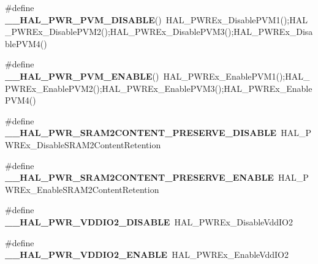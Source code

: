 \begin{DoxyCompactItemize}
\item 
\#define {\bfseries \+\_\+\+\_\+\+H\+A\+L\+\_\+\+P\+W\+R\+\_\+\+P\+V\+M\+\_\+\+D\+I\+S\+A\+B\+LE}()~H\+A\+L\+\_\+\+P\+W\+R\+Ex\+\_\+\+Disable\+P\+V\+M1();H\+A\+L\+\_\+\+P\+W\+R\+Ex\+\_\+\+Disable\+P\+V\+M2();H\+A\+L\+\_\+\+P\+W\+R\+Ex\+\_\+\+Disable\+P\+V\+M3();H\+A\+L\+\_\+\+P\+W\+R\+Ex\+\_\+\+Disable\+P\+V\+M4()\hypertarget{group___h_a_l___p_w_r___aliased___macros_gaec66f2306538bb9002387ceafeb38462}{}\label{group___h_a_l___p_w_r___aliased___macros_gaec66f2306538bb9002387ceafeb38462}

\item 
\#define {\bfseries \+\_\+\+\_\+\+H\+A\+L\+\_\+\+P\+W\+R\+\_\+\+P\+V\+M\+\_\+\+E\+N\+A\+B\+LE}()~H\+A\+L\+\_\+\+P\+W\+R\+Ex\+\_\+\+Enable\+P\+V\+M1();H\+A\+L\+\_\+\+P\+W\+R\+Ex\+\_\+\+Enable\+P\+V\+M2();H\+A\+L\+\_\+\+P\+W\+R\+Ex\+\_\+\+Enable\+P\+V\+M3();H\+A\+L\+\_\+\+P\+W\+R\+Ex\+\_\+\+Enable\+P\+V\+M4()\hypertarget{group___h_a_l___p_w_r___aliased___macros_ga48b28ca62d86e12f33848cbb20ea16dc}{}\label{group___h_a_l___p_w_r___aliased___macros_ga48b28ca62d86e12f33848cbb20ea16dc}

\item 
\#define {\bfseries \+\_\+\+\_\+\+H\+A\+L\+\_\+\+P\+W\+R\+\_\+\+S\+R\+A\+M2\+C\+O\+N\+T\+E\+N\+T\+\_\+\+P\+R\+E\+S\+E\+R\+V\+E\+\_\+\+D\+I\+S\+A\+B\+LE}~H\+A\+L\+\_\+\+P\+W\+R\+Ex\+\_\+\+Disable\+S\+R\+A\+M2\+Content\+Retention\hypertarget{group___h_a_l___p_w_r___aliased___macros_ga3cd8ad30e5e9e533d0a60fecfc541f03}{}\label{group___h_a_l___p_w_r___aliased___macros_ga3cd8ad30e5e9e533d0a60fecfc541f03}

\item 
\#define {\bfseries \+\_\+\+\_\+\+H\+A\+L\+\_\+\+P\+W\+R\+\_\+\+S\+R\+A\+M2\+C\+O\+N\+T\+E\+N\+T\+\_\+\+P\+R\+E\+S\+E\+R\+V\+E\+\_\+\+E\+N\+A\+B\+LE}~H\+A\+L\+\_\+\+P\+W\+R\+Ex\+\_\+\+Enable\+S\+R\+A\+M2\+Content\+Retention\hypertarget{group___h_a_l___p_w_r___aliased___macros_ga6e94fe92e8c944021c1a82cc9ab4b977}{}\label{group___h_a_l___p_w_r___aliased___macros_ga6e94fe92e8c944021c1a82cc9ab4b977}

\item 
\#define {\bfseries \+\_\+\+\_\+\+H\+A\+L\+\_\+\+P\+W\+R\+\_\+\+V\+D\+D\+I\+O2\+\_\+\+D\+I\+S\+A\+B\+LE}~H\+A\+L\+\_\+\+P\+W\+R\+Ex\+\_\+\+Disable\+Vdd\+I\+O2\hypertarget{group___h_a_l___p_w_r___aliased___macros_ga61f85ad4cd0958d67c8cf027a1b67da5}{}\label{group___h_a_l___p_w_r___aliased___macros_ga61f85ad4cd0958d67c8cf027a1b67da5}

\item 
\#define {\bfseries \+\_\+\+\_\+\+H\+A\+L\+\_\+\+P\+W\+R\+\_\+\+V\+D\+D\+I\+O2\+\_\+\+E\+N\+A\+B\+LE}~H\+A\+L\+\_\+\+P\+W\+R\+Ex\+\_\+\+Enable\+Vdd\+I\+O2\hypertarget{group___h_a_l___p_w_r___aliased___macros_ga0dabc2d8d35163d52c02fcbd04fd14a6}{}\label{group___h_a_l___p_w_r___aliased___macros_ga0dabc2d8d35163d52c02fcbd04fd14a6}


\end{DoxyCompactItemize}
